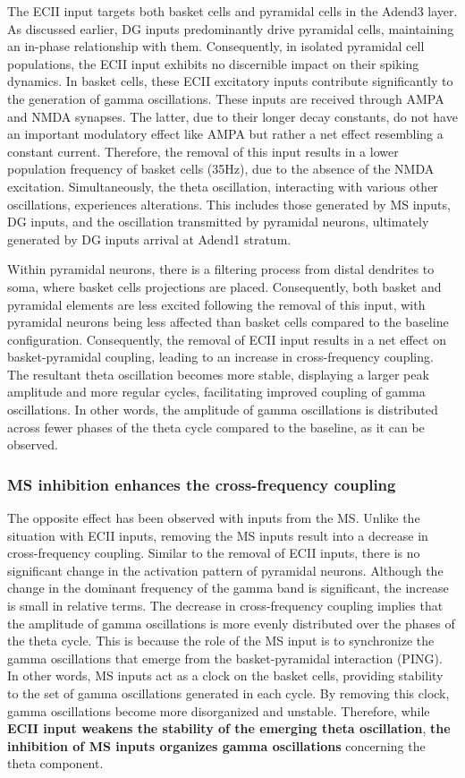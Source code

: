 \documentclass[../main.tex]{subfiles}
\begin{document}
The ECII input targets both basket cells and pyramidal cells in the Adend3 layer.
As discussed earlier, DG inputs predominantly drive pyramidal cells, maintaining an in-phase relationship with them. Consequently, in isolated pyramidal cell populations, the ECII input exhibits no discernible impact on their spiking dynamics. In basket cells, these ECII excitatory inputs contribute significantly to the generation of gamma oscillations.
These inputs are received through AMPA and NMDA synapses.
The latter, due to their longer decay constants, do not have an important modulatory effect like AMPA but rather a net effect resembling a constant current.
Therefore, the removal of this input results in a lower population frequency of basket cells (35Hz), due to the absence of the NMDA excitation.
Simultaneously, the theta oscillation, interacting with various other oscillations, experiences alterations.
This includes those generated by MS inputs, DG inputs, and the oscillation transmitted by pyramidal neurons, ultimately generated by DG inputs arrival at Adend1 stratum.

Within pyramidal neurons, there is a filtering process from distal dendrites to soma, where basket cells projections are placed.
Consequently, both basket and pyramidal elements are less excited following the removal of this input, with pyramidal neurons being less affected than basket cells compared to the baseline configuration.
Consequently, the removal of ECII input results in a net effect on basket-pyramidal coupling, leading to an increase in cross-frequency coupling. 
The resultant theta oscillation becomes more stable, displaying a larger peak amplitude and more regular cycles, facilitating improved coupling of gamma oscillations. 
In other words, the amplitude of gamma oscillations is distributed across fewer phases of the theta cycle compared to the baseline, as it can be observed.
\clearpage
\subsubsection{MS inhibition enhances the cross-frequency coupling}
The opposite effect has been observed with inputs from the MS.
Unlike the situation with ECII inputs, removing the MS inputs result into a decrease in cross-frequency coupling.
Similar to the removal of ECII inputs, there is no significant change in the activation pattern of pyramidal neurons.
Although the change in the dominant frequency of the gamma band is significant, the increase is small in relative terms.
The decrease in cross-frequency coupling implies that the amplitude of gamma oscillations is more evenly distributed over the phases of the theta cycle.
This is because the role of the MS input is to synchronize the gamma oscillations that emerge from the basket-pyramidal interaction (PING).
In other words, MS inputs act as a clock on the basket cells, providing stability to the set of gamma oscillations generated in each cycle.
By removing this clock, gamma oscillations become more disorganized and unstable.
Therefore, while \textbf{ECII input weakens the stability of the emerging theta oscillation}, \textbf{the inhibition of MS inputs organizes gamma oscillations} concerning the theta component.
\end{document}

